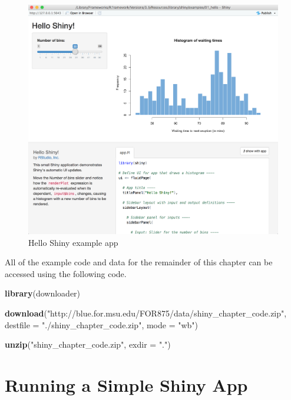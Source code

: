 \documentclass[]{krantz}
\makeatletter
\newenvironment{Shaded}{\begin{snugshade}}{\end{snugshade}}
\newcommand{\DataTypeTok}[1]{\textcolor[rgb]{0.27,0.27,0.27}{#1}}
\newcommand{\KeywordTok}[1]{\textcolor[rgb]{0.27,0.27,0.27}{\textbf{#1}}}
\newcommand{\NormalTok}[1]{#1}
\newcommand{\StringTok}[1]{\textcolor[rgb]{0.5,0.5,0.5}{#1}}
\newenvironment{kframe}{%
\medskip{}
\setlength{\fboxsep}{.8em}
 \def\at@end@of@kframe{}%
 \ifinner\ifhmode%
  \def\at@end@of@kframe{\end{minipage}}%
  \begin{minipage}{\columnwidth}%
 \fi\fi%
 \def\FrameCommand##1{\hskip\@totalleftmargin \hskip-\fboxsep
 \colorbox{shadecolor}{##1}\hskip-\fboxsep
     \hskip-\linewidth \hskip-\@totalleftmargin \hskip\columnwidth}%
 \MakeFramed {\advance\hsize-\width
   \@totalleftmargin\z@ \linewidth\hsize
   \@setminipage}}%
 {\par\unskip\endMakeFramed%
 \at@end@of@kframe}
\renewenvironment{Shaded}{\begin{kframe}}{\end{kframe}}
\makeatother
\begin{document}
\begin{figure}
\includegraphics[width=26.61in]{../../for875-19/figures/hello_shiny} \caption{Hello Shiny example app}\label{fig:hello}
\end{figure}

All of the example code and data for the remainder of this chapter can be accessed using the following code.

\begin{Shaded}
\begin{Highlighting}[]
\KeywordTok{library}\NormalTok{(downloader)}

\KeywordTok{download}\NormalTok{(}\StringTok{"http://blue.for.msu.edu/FOR875/data/shiny_chapter_code.zip"}\NormalTok{, }
  \DataTypeTok{destfile =} \StringTok{"./shiny_chapter_code.zip"}\NormalTok{, }\DataTypeTok{mode =} \StringTok{"wb"}\NormalTok{)}

\KeywordTok{unzip}\NormalTok{(}\StringTok{"shiny_chapter_code.zip"}\NormalTok{, }\DataTypeTok{exdir =} \StringTok{"."}\NormalTok{)}
\end{Highlighting}
\end{Shaded}

\hypertarget{running-a-simple-shiny-app}{%
\section{Running a Simple Shiny App}\label{running-a-simple-shiny-app}}
\end{document}
